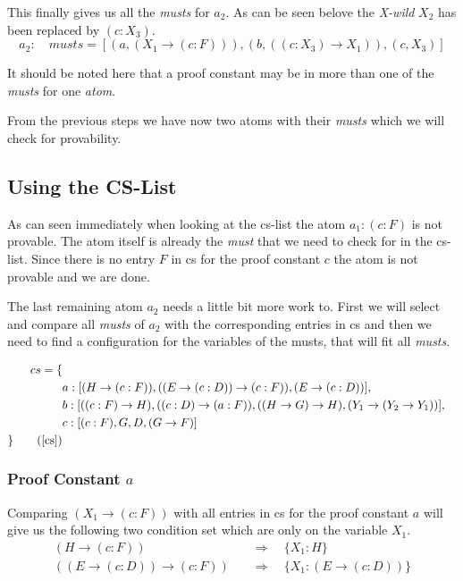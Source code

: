 This finally gives us all the \emph{musts} for $a_2$. As can be seen belove the \emph{X-wild} $X_2$ has been replaced by $(c:X_3)$.
\begin{equation}\label{eq:a2_musts}
	a_2: \quad musts = [(a, (X_1 \rightarrow (c:F))), (b, ((c:X_3) \rightarrow X_1)), (c, X_3)]
\end{equation}

It should be noted here that a proof constant may be in more than one of the \emph{musts} for one \emph{atom}. 

From the previous steps we have now two atoms with their \emph{musts} which we will check for provability. 

\subsection{Using the CS-List}
As can seen immediately when looking at the cs-list the atom $a_1: (c:F)$ is not provable. The atom itself is already the \emph{must} that we need to check for in the cs-list. Since there is no entry $F$ in cs for the proof constant $c$ the atom is not provable and we are done.

The last remaining atom $a_2$ needs a little bit more work to. First we will select and compare all \emph{musts} of $a_2$ with the corresponding entries in cs and then we need to find a configuration for the variables of the musts, that will fit all \emph{musts}.

\begin{align*}
	cs = \{\\
	& a: [(H \rightarrow (c:F)), ((E \rightarrow (c:D)) \rightarrow (c:F)), (E \rightarrow (c:D))],\\
	& b: [((c:F) \rightarrow H), ((c:D) \rightarrow (a:F)), ((H \rightarrow G) \rightarrow H), (Y_1 \rightarrow (Y_2 \rightarrow Y_1))],\\
	& c: [(c:F), G, D, (G \rightarrow F)] \\
	\}
	\tag{\ref{cs}}
\end{align*}


\subsubsection[look up proof constant a]{Proof Constant $a$}
Comparing $(X_1 \rightarrow (c:F))$ with all entries in cs for the proof constant $a$ will give us the following two condition set which are only on the variable $X_1$.
\begin{align}
	(H \rightarrow (c:F)) & \quad \Rightarrow \quad \{X_1: H\} \\ 
	((E \rightarrow (c:D)) \rightarrow (c:F)) & \quad \Rightarrow  \quad \{X_1: (E \rightarrow (c:D))\} \label{condition:a}
\end{align}

